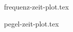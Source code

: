 \documentclass[11pt, a4paper]{article}
\begin{document}
\begin{figure}[h]
    {frequenz-zeit-plot.tex}
\end{figure}

\begin{figure}[h]
    {pegel-zeit-plot.tex}
\end{figure}
\end{document}

